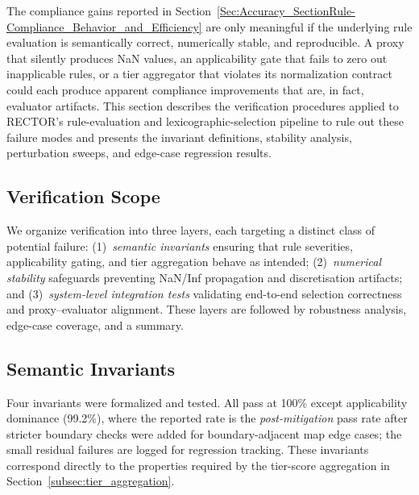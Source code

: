
The compliance gains reported in Section~\ref{Sec:Accuracy_SectionRule-Compliance_Behavior_and_Efficiency} are only meaningful if the underlying rule evaluation is semantically correct, numerically stable, and reproducible.  A proxy that silently produces NaN values, an applicability gate that fails to zero out inapplicable rules, or a tier aggregator that violates its normalization contract could each produce apparent compliance improvements that are, in fact, evaluator artifacts.  This section describes the verification procedures applied to RECTOR's rule-evaluation and lexicographic-selection pipeline to rule out these failure modes and presents the invariant definitions, stability analysis, perturbation sweeps, and edge-case regression results.
\subsection{Verification Scope}
\label{subsec:verification_scope}

We organize verification into three layers, each targeting a distinct class of potential failure: (1)~\emph{semantic invariants} ensuring that rule severities, applicability gating, and tier aggregation behave as intended; (2)~\emph{numerical stability} safeguards preventing NaN/Inf propagation and discretisation artifacts; and (3)~\emph{system-level integration tests} validating end-to-end selection correctness and proxy--evaluator alignment. These layers are followed by robustness analysis, edge-case coverage, and a summary.

\subsection{Semantic Invariants}
\label{subsec:semantic_invariants}

Four invariants were formalized and tested.  All pass at 100\% except applicability dominance (99.2\%), where the reported rate is the \emph{post-mitigation} pass rate after stricter boundary checks were added for boundary-adjacent map edge cases; the small residual failures are logged for regression tracking.  These invariants correspond directly to the properties required by the tier-score aggregation in Section~\ref{subsec:tier_aggregation}.

